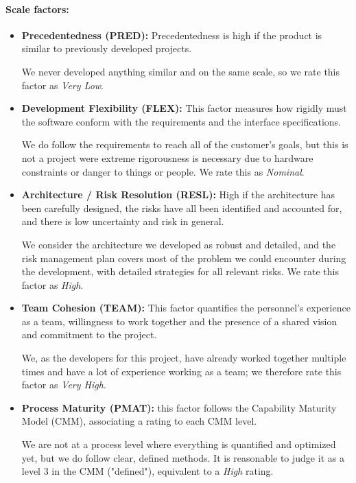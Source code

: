 \documentclass[english]{article}
\begin{document}


\paragraph{Scale factors:}
\begin{itemize}
	\item \textbf{Precedentedness (PRED):} 
	Precedentedness is high if the product is similar to previously developed projects.
	
	We never developed anything similar and on the same scale, so we rate this factor as \textit{Very Low}.
	
	\item \textbf{Development Flexibility (FLEX):} 	
	This factor measures how rigidly must the software conform with the requirements and the interface specifications.
	
	We do follow the requirements to reach all of the customer's goals, but this is not a project were extreme rigorousness is necessary due to hardware constraints or danger to things or people. We rate this as \textit{Nominal}.
	
	\item \textbf{Architecture / Risk Resolution (RESL):} High if the architecture has been carefully designed, the risks have all been identified and accounted for, and there is low uncertainty and risk in general.
	
	We consider the architecture we developed as robust and detailed, and the risk management plan covers most of the problem we could encounter during the development, with detailed strategies for all relevant risks. We rate this factor as \textit{High}.
	
	\item \textbf{Team Cohesion (TEAM):} 
	This factor quantifies the personnel's experience as a team, willingness to work together and the presence of a shared vision and commitment to the project.
	
	We, as the developers for this project, have already worked together multiple times and have a lot of experience working as a team; we therefore rate this factor as \textit{Very High}.
	
	\item \textbf{Process Maturity (PMAT):} this factor follows the Capability Maturity Model (CMM), associating a rating to each CMM level. 
	
	We are not at a process level where everything is quantified and optimized yet, but we do follow clear, defined methods. It is reasonable to judge it as a level 3 in the CMM ("defined"), equivalent to a \textit{High} rating.
\end{itemize}
\end{document}
